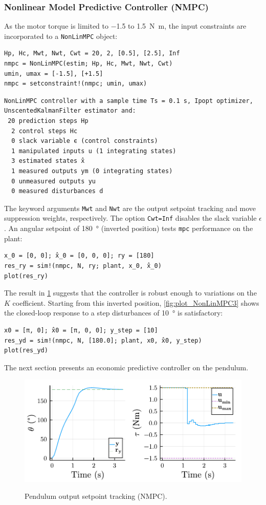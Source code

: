 \subsubsection{Nonlinear Model Predictive Controller (NMPC)}

As the motor torque is limited to \num{-1.5} to \SI{1.5}{\newton\meter}, the input constraints are incorporated to a \texttt{NonLinMPC} object:
\begin{verbatim}
Hp, Hc, Mwt, Nwt, Cwt = 20, 2, [0.5], [2.5], Inf
nmpc = NonLinMPC(estim; Hp, Hc, Mwt, Nwt, Cwt)
umin, umax = [-1.5], [+1.5]
nmpc = setconstraint!(nmpc; umin, umax)
\end{verbatim}
\spacerepl
\begin{verbatim}
NonLinMPC controller with a sample time Ts = 0.1 s, Ipopt optimizer, 
UnscentedKalmanFilter estimator and:
 20 prediction steps Hp
  2 control steps Hc
  0 slack variable ϵ (control constraints)
  1 manipulated inputs u (1 integrating states)
  3 estimated states x̂
  1 measured outputs ym (0 integrating states)
  0 unmeasured outputs yu
  0 measured disturbances d
\end{verbatim}
The keyword arguments \texttt{Mwt} and \texttt{Nwt} are the output setpoint tracking and move suppression weights, respectively. The option \texttt{Cwt=Inf} disables the slack variable $\epsilon$. An angular setpoint of \SI{180}{\degree} (inverted position) tests \texttt{mpc} performance on the plant:
\begin{verbatim}
x_0 = [0, 0]; x̂_0 = [0, 0, 0]; ry = [180]
res_ry = sim!(nmpc, N, ry; plant, x_0, x̂_0)
plot(res_ry)
\end{verbatim}
The result in \cref{fig:plot_NonLinMPC2} suggests that the controller is robust enough to variations on the $K$ coefficient. Starting from this inverted position, \cref{fig:plot_NonLinMPC3} shows the closed-loop response to a step disturbances of \SI{10}{\degree} is satisfactory:
\begin{verbatim}
x0 = [π, 0]; x̂0 = [π, 0, 0]; y_step = [10]
res_yd = sim!(nmpc, N, [180.0]; plant, x0, x̂0, y_step)
plot(res_yd)
\end{verbatim}
The next section presents an economic predictive controller on the pendulum.

\begin{figure}[t]
    \centering
    \caption{Pendulum output setpoint tracking (NMPC).}
    \includegraphics[width=0.5\columnwidth]{fig/plot_NonLinMPC2.pdf}
    \label{fig:plot_NonLinMPC2}
\end{figure}

